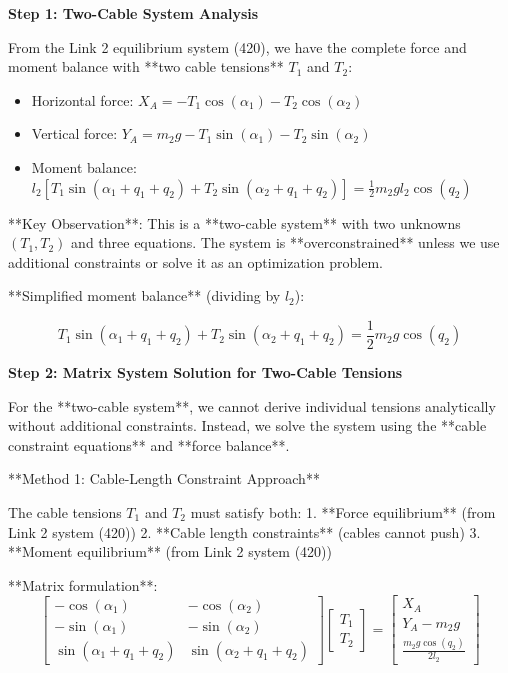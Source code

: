\textbf{Step 1: Two-Cable System Analysis}

From the Link 2 equilibrium system (420), we have the complete force and moment balance with **two cable tensions** $T_1$ and $T_2$:

\begin{itemize}
    \item Horizontal force: $X_A = -T_1 \cos(\alpha_1) - T_2 \cos(\alpha_2)$
    \item Vertical force: $Y_A = m_2 g - T_1 \sin(\alpha_1) - T_2 \sin(\alpha_2)$
    \item Moment balance: $l_2[T_1 \sin(\alpha_1 + q_1 + q_2) + T_2 \sin(\alpha_2 + q_1 + q_2)] = \frac{1}{2} m_2 g l_2 \cos(q_2)$
\end{itemize}

**Key Observation**: This is a **two-cable system** with two unknowns $(T_1, T_2)$ and three equations. The system is **overconstrained** unless we use additional constraints or solve it as an optimization problem.

**Simplified moment balance** (dividing by $l_2$):

$$T_1 \sin(\alpha_1 + q_1 + q_2) + T_2 \sin(\alpha_2 + q_1 + q_2) = \frac{1}{2} m_2 g \cos(q_2)$$

\textbf{Step 2: Matrix System Solution for Two-Cable Tensions}

For the **two-cable system**, we cannot derive individual tensions analytically without additional constraints. Instead, we solve the system using the **cable constraint equations** and **force balance**.

**Method 1: Cable-Length Constraint Approach**

The cable tensions $T_1$ and $T_2$ must satisfy both:
1. **Force equilibrium** (from Link 2 system (420))  
2. **Cable length constraints** (cables cannot push)
3. **Moment equilibrium** (from Link 2 system (420))

**Matrix formulation**:
$$\begin{bmatrix}
-\cos(\alpha_1) & -\cos(\alpha_2) \\
-\sin(\alpha_1) & -\sin(\alpha_2) \\
\sin(\alpha_1 + q_1 + q_2) & \sin(\alpha_2 + q_1 + q_2)
\end{bmatrix} \begin{bmatrix} T_1 \\ T_2 \end{bmatrix} = \begin{bmatrix} X_A \\ Y_A - m_2 g \\ \frac{m_2 g \cos(q_2)}{2 l_2} \end{bmatrix}$$

